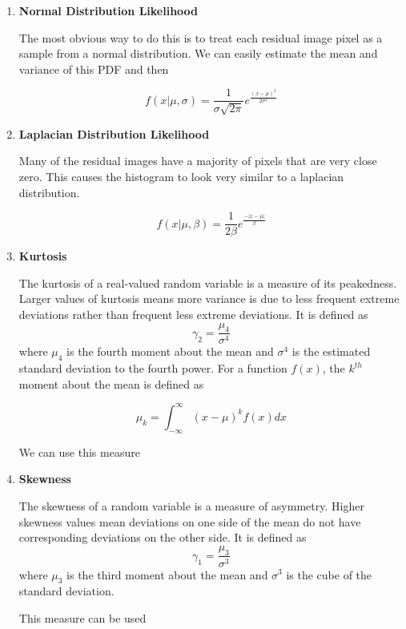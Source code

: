 \begin{enumerate}
\item{\textbf{Normal Distribution Likelihood}}

The most obvious way to do this is to treat each residual image pixel as a sample from a normal distribution.  We can easily estimate the mean and variance of this PDF and then 

$$f(x|\mu,\sigma)=\frac{1}{\sigma\sqrt{2\pi}}e^{\frac{(x-\mu)^2}{2\sigma^2}}$$


\item{\textbf{Laplacian Distribution Likelihood}}

Many of the residual images have a majority of pixels that are very close zero.  This causes the histogram to look very similar to a laplacian distribution.

$$f(x|\mu,\beta)=\frac{1}{2\beta}e^{\frac{-|x-\mu|}{\beta}}$$

\item{\textbf{Kurtosis}}

The kurtosis of a real-valued random variable is a measure of its peakedness.  Larger values of kurtosis means more variance is due to less frequent extreme deviations rather than frequent less extreme deviations.  It is defined as $$\gamma_2=\frac{\mu_4}{\sigma^4}$$ where $\mu_4$ is the fourth moment about the mean and $\sigma^4$ is the estimated standard deviation to the fourth power.  For a function $f(x)$, the $k^{th}$ moment about the mean is defined as 

$$\mu_k = \int_{-\infty}^{\infty}{(x-\mu)^kf(x)dx}$$

We can use this measure 

\item{\textbf{Skewness}}

The skewness of a random variable is a measure of asymmetry.  Higher skewness values mean deviations on one side of the mean do not have corresponding deviations on the other side.  It is defined as $$\gamma_1=\frac{\mu_3}{\sigma^3}$$ where $\mu_3$ is the third moment about the mean and $\sigma^3$ is the cube of the standard deviation.

This measure can be used


\end{enumerate}


